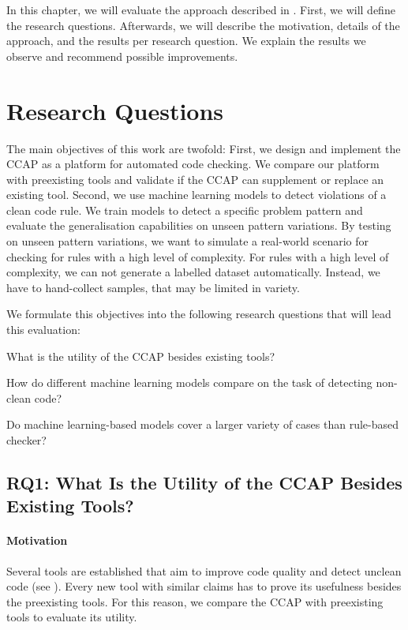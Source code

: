 In this chapter, we will evaluate the approach described in . First, we will define the research questions. Afterwards, we will describe the motivation, details of the approach, and the results per research question. We explain the results we observe and recommend possible improvements.

\section{Research Questions}
The main objectives of this work are twofold: First, we design and implement the CCAP as a platform for automated code checking. We compare our platform with preexisting tools and validate if the CCAP can supplement or replace an existing tool. 
Second, we use machine learning models to detect violations of a clean code rule. We train models to detect a specific problem pattern and evaluate the generalisation capabilities on unseen pattern variations. By testing on unseen pattern variations, we want to simulate a real-world scenario for checking for rules with a high level of complexity. For rules with a high level of complexity, we can not generate a labelled dataset automatically. Instead, we have to hand-collect samples, that may be limited in variety.

We formulate this objectives into the following research questions that will lead this evaluation:
\begin{description}
    \setlength{\itemsep}{1pt}
    \item[RQ1]What is the utility of the CCAP besides existing tools? 
    \item[RQ2]How do different machine learning models compare on the task of detecting non-clean code?
    \item[RQ3]Do machine learning-based models cover a larger variety of cases than rule-based checker? 
\end{description}

\subsection{RQ1: What Is the Utility of the CCAP Besides Existing Tools?}\label{rq:1}
\paragraph{Motivation}
Several tools are established that aim to improve code quality and detect unclean code (see ). Every new tool with similar claims has to prove its usefulness besides the preexisting tools. For this reason, we compare the CCAP with preexisting tools to evaluate its utility.

